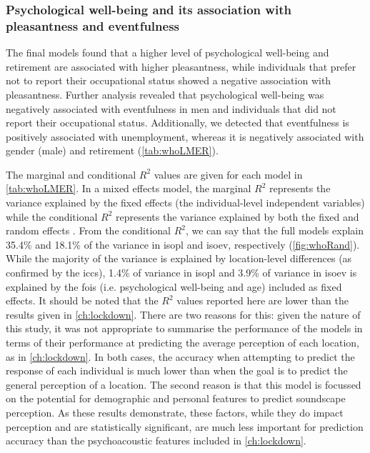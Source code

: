 \subsubsection*{Psychological well-being and its association with pleasantness and eventfulness}

The final models found that a higher level of psychological well-being and retirement are associated with higher pleasantness, while individuals that prefer not to report their occupational status showed a negative association with pleasantness. Further analysis revealed that psychological well-being was negatively associated with eventfulness in men and individuals that did not report their occupational status. Additionally, we detected that eventfulness is positively associated with unemployment, whereas it is negatively associated with gender (male) and retirement (\cref{tab:whoLMER}). 

The marginal and conditional $R^2$ values are given for each model in \cref{tab:whoLMER}. In a mixed effects model, the marginal $R^2$ represents the variance explained by the fixed effects (the individual-level independent variables) while the conditional $R^2$ represents the variance explained by both the fixed and random effects \citep{Nakagawa2012general}. From the conditional $R^2$, we can say that the full models explain 35.4\% and 18.1\% of the variance in \gls{isopl} and \gls{isoev}, respectively (\cref{fig:whoRand}). While the majority of the variance is explained by location-level differences (as confirmed by the \glspl{icc}), 1.4\% of variance in \gls{isopl} and 3.9\% of variance in \gls{isoev} is explained by the \glspl{foi} (i.e. psychological well-being and age) included as fixed effects. It should be noted that the $R^2$ values reported here are lower than the results given in \cref{ch:lockdown}. There are two reasons for this: given the nature of this study, it was not appropriate to summarise the performance of the models in terms of their performance at predicting the average perception of each location, as in \cref{ch:lockdown}. In both cases, the accuracy when attempting to predict the response of each individual is much lower than when the goal is to predict the general perception of a location. The second reason is that this model is focussed on the potential for demographic and personal features to predict soundscape perception. As these results demonstrate, these factors, while they do impact perception and are statistically significant, are much less important for prediction accuracy than the psychoacoustic features included in \cref{ch:lockdown}.

